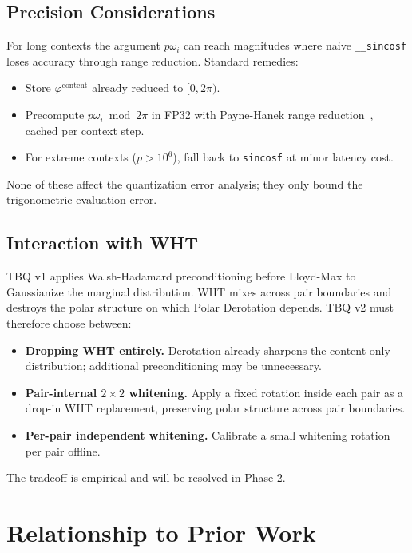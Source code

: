 \documentclass[10pt,twocolumn]{article}
\begin{document}
\subsection{Precision Considerations}

For long contexts the argument $p\omega_i$ can reach magnitudes where naive \texttt{\_\_sincosf} loses accuracy through range reduction. Standard remedies:
\begin{itemize}[leftmargin=*,topsep=1pt,itemsep=0pt]
\item Store $\varphi^{\text{content}}$ already reduced to $[0,2\pi)$.
\item Precompute $p\omega_i\bmod 2\pi$ in FP32 with Payne-Hanek range reduction~\cite{payne1983}, cached per context step.
\item For extreme contexts ($p>10^6$), fall back to \texttt{sincosf} at minor latency cost.
\end{itemize}
None of these affect the quantization error analysis; they only bound the trigonometric evaluation error.

\subsection{Interaction with WHT}

TBQ v1 applies Walsh-Hadamard preconditioning before Lloyd-Max to Gaussianize the marginal distribution. WHT mixes across pair boundaries and destroys the polar structure on which Polar Derotation depends. TBQ v2 must therefore choose between:
\begin{itemize}[leftmargin=*,topsep=1pt,itemsep=0pt]
\item \textbf{Dropping WHT entirely.} Derotation already sharpens the content-only distribution; additional preconditioning may be unnecessary.
\item \textbf{Pair-internal $2\times 2$ whitening.} Apply a fixed rotation inside each pair as a drop-in WHT replacement, preserving polar structure across pair boundaries.
\item \textbf{Per-pair independent whitening.} Calibrate a small whitening rotation per pair offline.
\end{itemize}
The tradeoff is empirical and will be resolved in Phase 2.

\section{Relationship to Prior Work}
\label{sec:related}
\end{document}
